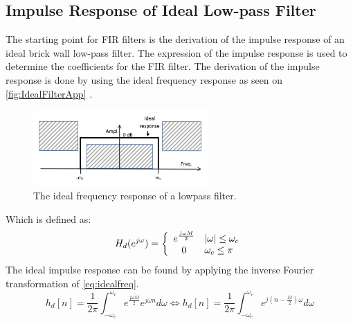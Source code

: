 \subsection*{Impulse Response of Ideal Low-pass Filter}
The starting point for FIR filters is the derivation of the impulse response of an ideal brick wall low-pass filter. The expression of the impulse response is used to determine the coefficients for the FIR filter. The derivation of the impulse response is done by using the ideal frequency response as seen on \autoref{fig:IdealFilterApp} \citep{sou:FIRpart4}. 
\begin{figure}[H]
\centering
\includegraphics[width=0.6\textwidth]{figures/Ideal_filter.png}
\caption{The ideal frequency response of a lowpass filter.}
\label{fig:IdealFilterApp}
\end{figure}
Which is defined as:
\begin{equation} \label{eq:idealfreq}
H_d(e^{j\omega})=\left\{
\begin{array}{c l}      
    e^{\frac{j\omega M}{2}} & |\omega|\leq\omega_c\\
    0 & \omega_c\leq\pi
\end{array}\right.
\end{equation}
The ideal impulse response can be found by applying the inverse Fourier transformation of \autoref{eq:idealfreq}.
\begin{equation}
h_d[n]=\frac{1}{2\pi}\int_{-\omega_c}^{\omega_c}e^{\frac{j\omega M}{2}} e^{j\omega n} d\omega \Leftrightarrow h_d[n]=\frac{1}{2\pi}\int_{-\omega_c}^{\omega_c}e^{j(n-\frac{M}{2})\omega} d\omega
\end{equation}

